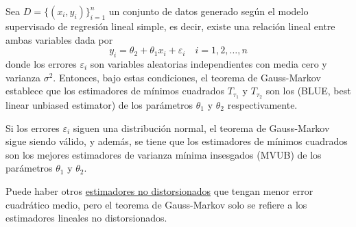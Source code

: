 \begin{teo}
    Sea $D=\{(x_i,y_i)\}_{i=1}^{n}$ un conjunto de datos generado según el modelo supervisado de regresión lineal simple, es decir, existe una relación lineal entre ambas variables dada por
    \begin{equation*}
        y_i = \theta_2 + \theta_1 x_i + \varepsilon_i \quad i=1,2,\ldots,n
    \end{equation*}
    donde los errores $\varepsilon_i$ son variables aleatorias independientes con media cero y varianza $\sigma^2$. Entonces, bajo estas condiciones, el teorema de Gauss-Markov establece que los estimadores de mínimos cuadrados $T_{\tau_1}$ y $T_{\tau_2}$ son los  (BLUE, best linear unbiased estimator) de los parámetros $\theta_1$ y $\theta_2$ respectivamente.
\end{teo}

\begin{observacion}
    Si los errores $\varepsilon_i$ siguen una distribución normal, el teorema de Gauss-Markov sigue siendo válido, y además, se tiene que los estimadores de mínimos cuadrados son los mejores estimadores de varianza mínima insesgados (MVUB) de los parámetros $\theta_1$ y $\theta_2$.
\end{observacion}
\begin{observacion}
    Puede haber otros \underline{estimadores no distorsionados} que tengan menor error cuadrático medio, pero el teorema de Gauss-Markov solo se refiere a los estimadores lineales no distorsionados.
\end{observacion}

